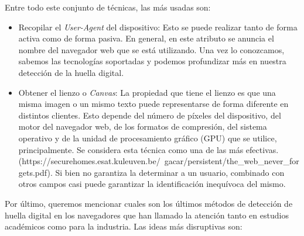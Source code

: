 Entre todo este conjunto de técnicas, las más usadas son: \par 

\begin{itemize}
	\item Recopilar el \textit{User-Agent} del dispositivo: Esto se puede realizar tanto de forma activa como de forma pasiva. En general, en este atributo se anuncia el nombre del navegador web que se está utilizando. Una vez lo conozcamos, sabemos las tecnologías soportadas y podemos profundizar más en nuestra detección de la huella digital.
	
	\item Obtener el lienzo o \textit{Canvas}: La propiedad que tiene el lienzo es que una misma imagen o un mismo texto puede representarse de forma diferente en distintos clientes. Esto depende del número de píxeles del dispositivo, del motor del navegador web, de los formatos de compresión, del sistema operativo y de la unidad de procesamiento gráfico (GPU) que se utilice, principalmente. Se considera esta técnica como una de las más efectivas. (https://securehomes.esat.kuleuven.be/~gacar/persistent/the_web_never_forgets.pdf). Si bien no garantiza la determinar a un usuario, combinado con otros campos casi puede garantizar la identificación inequívoca del mismo.
	
\end{itemize}

Por último, queremos mencionar cuales son los últimos métodos de detección de huella digital en los navegadores que han llamado la atención tanto en estudios académicos como para la industria. Las ideas más disruptivas son: \par

